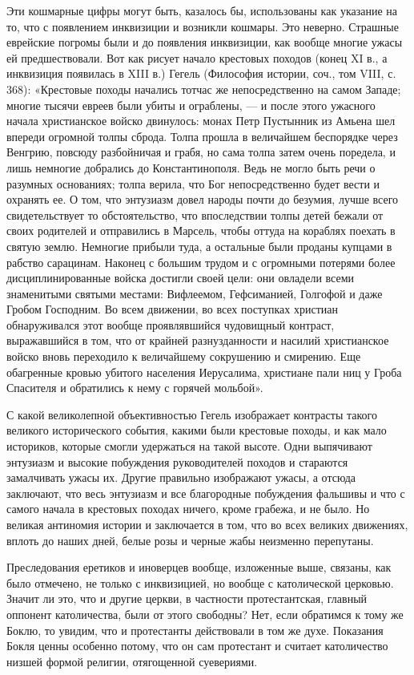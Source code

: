 Эти кошмарные цифры могут быть, казалось бы, использованы как указание на то,
что с появлением инквизиции и возникли кошмары. Это неверно. Страшные еврейские
погромы были и до появления инквизиции, как вообще многие ужасы ей
предшествовали. Вот как рисует начало крестовых походов (конец XI в., а
инквизиция появилась в XIII в.) Гегель (Философия истории, соч., том VIII, с.
368): «Крестовые походы начались тотчас же непосредственно на самом Западе;
многие тысячи евреев были убиты и ограблены, --- и после этого ужасного начала
христианское войско двинулось: монах Петр Пустынник из Амьена шел впереди
огромной толпы сброда. Толпа прошла в величайшем беспорядке через Венгрию,
повсюду разбойничая и грабя, но сама толпа затем очень поредела, и лишь
немногие добрались до Константинополя. Ведь не могло быть речи о разумных
основаниях; толпа верила, что Бог непосредственно будет вести и охранять ее. О
том, что энтузиазм довел народы почти до безумия, лучше всего свидетельствует
то обстоятельство, что впоследствии толпы детей бежали от своих родителей и
отправились в Марсель, чтобы оттуда на кораблях поехать в святую землю.
Немногие прибыли туда, а остальные были проданы купцами в рабство сарацинам.
Наконец с большим трудом и с огромными потерями более дисциплинированные войска
достигли своей цели: они овладели всеми знаменитыми святыми местами: Вифлеемом,
Гефсиманией, Голгофой и даже Гробом Господним. Во всем движении, во всех
поступках христиан обнаруживался этот вообще проявлявшийся чудовищный контраст,
выражавшийся в том, что от крайней разнузданности и насилий христианское войско
вновь переходило к величайшему сокрушению и смирению. Еще обагренные кровью
убитого населения Иерусалима, христиане пали ниц у Гроба Спасителя и обратились
к нему с горячей мольбой».

С какой великолепной объективностью Гегель изображает контрасты такого великого
исторического события, какими были крестовые походы, и как мало историков,
которые смогли удержаться на такой высоте. Одни выпячивают энтузиазм и высокие
побуждения руководителей походов и стараются замалчивать ужасы их. Другие
правильно изображают ужасы, а отсюда заключают, что весь энтузиазм и все
благородные побуждения фальшивы и что с самого начала в крестовых походах
ничего, кроме грабежа, и не было. Но великая антиномия истории и заключается в
том, что во всех великих движениях, вплоть до наших дней, белые розы и черные
жабы неизменно перепутаны.

Преследования еретиков и иноверцев вообще, изложенные выше, связаны, как было
отмечено, не только с инквизицией, но вообще с католической церковью. Значит ли
это, что и другие церкви, в частности протестантская, главный оппонент
католичества, были от этого свободны? Нет, если обратимся к тому же Боклю, то
увидим, что и протестанты действовали в том же духе. Показания Бокля ценны
особенно потому, что он сам протестант и считает католичество низшей формой
религии, отягощенной суевериями.

